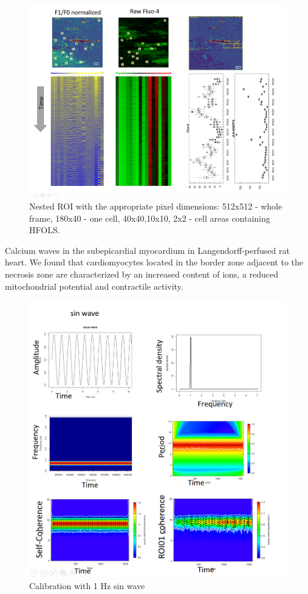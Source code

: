 \documentclass{biophys-new}
\begin{document}
\begin{figure}
    \includegraphics[width=0.8\linewidth]{fig5.png}
    \caption{Nested ROI with the appropriate pixel dimensions: 512x512 - whole frame, 180x40 - one cell, 40x40,10x10, 2x2 - cell areas containing HFOLS.}
    \label{fig:fig5}
\end{figure}

Calcium waves in the subepicardial myocardium in Langendorff-perfused rat heart.
We found that cardiomyocytes located in the border zone adjacent to the necrosis zone are characterized by an increased content of  ions, a reduced mitochondrial potential and contractile activity.


\begin{figure}[hbt!]
\centering
\includegraphics[width=0.6\linewidth]{fig6.png}
\caption{Calibration with 1 Hz sin wave}
\label{fig:fig6}
\end{figure}
\end{document}
